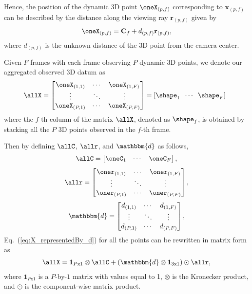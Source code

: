 Hence, the position of the dynamic 3D point $\oneX_{(p,f)}$ corresponding to $\mathbf x_{(p,f)}$ can be described by the distance along the viewing ray $\mathbf{r}_{(p,f)}$ given by
\begin{equation}
\oneX_{(p,f)} = \mathbf{C}_f + d_{(p,f)} \mathbf{r}_{(p,f)},
\label{eq:X_representedBy_d}
\end{equation}
where %
$d_{(p,f)}$
is the unknown distance of the 3D point from the camera center.

Given $F$ frames with each frame observing $P$ dynamic 3D points, we denote our aggregated observed 3D datum as
\begin{equation}
\label{eq:observationstructure}
\allX =
\begin{bmatrix}
\oneX_{(1,1)} & \cdots & \oneX_{(1,F)} \\
            \vdots  & \ddots & \vdots              \\
\oneX_{(P,1)} & \cdots & \oneX_{(P,F)} \\
\end{bmatrix} =
\left[
\shape_1\; \;  \cdots \; \;   \shape_F
\right]\;\;
\end{equation}
where the $f$-th column of the matrix $\allX$, denoted as $\shape_f$, is obtained by stacking all the $P$ 3D points observed in the $f$-th frame.

Then by defining $\allC$, $\allr$, and $\mathbbm{d}$ as follows,
\begin{equation}
\allC =
\begin{bmatrix}
\oneC_{1} & \cdots & \oneC_{F}
\end{bmatrix},
\end{equation}
\begin{equation}
\allr = 
\begin{bmatrix}
\oner_{(1,1)} & \cdots & \oner_{(1,F)} \\
            \vdots  & \ddots & \vdots              \\
\oner_{(P,1)} & \cdots & \oner_{(P,F)} \\
\end{bmatrix},
\end{equation}
\begin{equation}
\mathbbm{d} =
\begin{bmatrix}
d_{(1,1)} & \cdots & d_{(1,F)} \\
            \vdots  & \ddots & \vdots              \\
d_{(P,1)} & \cdots & d_{(P,F)} \\
\end{bmatrix},
\end{equation}
Eq.~(\ref{eq:X_representedBy_d}) for all the points can be rewritten in matrix form as
\begin{equation}
\allX = \mathbf{1}_{P\text{x}1} \otimes \allC + 
(\mathbbm{d} \otimes \mathbf{1}_{3\text{x}1}) \odot \allr,
\label{eq:X_representedBy_d_all}
\end{equation}
where $\mathbf{1}_{P\text{x}1}$ is a $P$-by-$1$ matrix with values equal to 1, $\otimes$ is the Kronecker product, and $\odot$ is the component-wise matrix product. %

